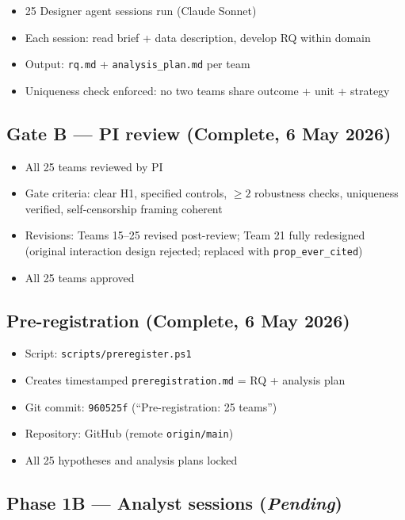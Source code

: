 \documentclass[12pt,a4paper]{article}
\begin{document}
\begin{itemize}
  \item 25 Designer agent sessions run (Claude Sonnet)
  \item Each session: read brief + data description, develop RQ within domain
  \item Output: \texttt{rq.md} + \texttt{analysis\_plan.md} per team
  \item Uniqueness check enforced: no two teams share outcome + unit + strategy
\end{itemize}

\subsection{Gate B --- PI review (Complete, 6 May 2026)}

\begin{itemize}
  \item All 25 teams reviewed by PI
  \item Gate criteria: clear H1, specified controls, $\geq 2$ robustness checks,
    uniqueness verified, self-censorship framing coherent
  \item Revisions: Teams 15--25 revised post-review; Team 21 fully redesigned
    (original interaction design rejected; replaced with \texttt{prop\_ever\_cited})
  \item All 25 teams approved
\end{itemize}

\subsection{Pre-registration (Complete, 6 May 2026)}

\begin{itemize}
  \item Script: \texttt{scripts/preregister.ps1}
  \item Creates timestamped \texttt{preregistration.md} = RQ + analysis plan
  \item Git commit: \texttt{960525f} (``Pre-registration: 25 teams'')
  \item Repository: GitHub (remote \texttt{origin/main})
  \item All 25 hypotheses and analysis plans locked
\end{itemize}

\subsection{Phase 1B --- Analyst sessions (\emph{Pending})}
\end{document}
